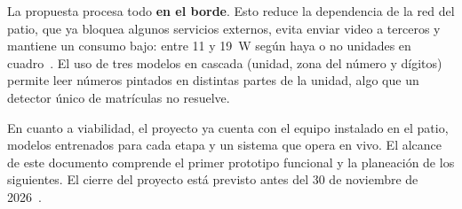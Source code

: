 La propuesta procesa todo \textbf{en el borde}. Esto reduce la dependencia
de la red del patio, que ya bloquea algunos servicios externos, evita
enviar video a terceros y mantiene un consumo bajo: entre 11 y 19~W según
haya o no unidades en cuadro~\cite{rep-tecnico}. El uso de tres modelos en
cascada (unidad, zona del número y dígitos) permite leer números pintados
en distintas partes de la unidad, algo que un detector único de matrículas
no resuelve.

En cuanto a viabilidad, el proyecto ya cuenta con el equipo instalado en el
patio, modelos entrenados para cada etapa y un sistema que opera en vivo.
El alcance de este documento comprende el primer prototipo funcional y la
planeación de los siguientes. El cierre del proyecto está previsto antes
del 30 de noviembre de 2026~\cite{rep-tecnico}.
